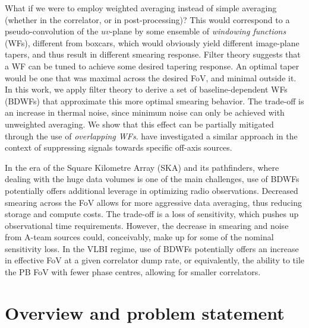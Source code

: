 \documentclass[useAMS,usenatbib]{mn2e}
\begin{document}
What if we were to employ weighted averaging instead of simple averaging (whether in the correlator, or in post-processing)? 
This would correspond to a  pseudo-convolution of the $uv$-plane by some ensemble of \emph{windowing functions} (WFs), 
different from boxcars, which would obviously yield different image-plane tapers, and thus result in different 
smearing response. Filter theory suggests that a WF can be tuned to achieve some desired tapering response. 
An optimal taper would be one that was maximal across the desired FoV, and minimal outside it. In this work, 
we apply filter theory to derive a set of baseline-dependent WFs (BDWFs) that approximate this more optimal smearing 
behavior. The trade-off is an increase in thermal noise, since minimum noise can only be achieved with 
unweighted averaging. We show that this effect can be partially mitigated through the use of \emph{overlapping WFs}. 
\citet{offringa-filtering} have investigated a similar approach in the context of suppressing signals towards specific off-axis
sources. 

In the era of the Square Kilometre Array (SKA) and its pathfinders, where dealing with the huge data volumes is one of
the main challenges, use of BDWFs potentially offers additional leverage in optimizing radio observations. 
Decreased smearing across the FoV allows for more aggressive data averaging, thus reducing storage and compute costs. 
The trade-off is a loss of sensitivity, which pushes up observational time requirements. However, the decrease in smearing
and noise from A-team sources could, conceivably, make up for some of the nominal sensitivity loss. 
In the VLBI regime, use of BDWFs potentially offers an increase in effective FoV at a given correlator dump rate, or 
equivalently, the ability to tile the PB FoV with fewer phase centres, allowing
for smaller correlators.

\section{Overview and problem statement}
\end{document}
